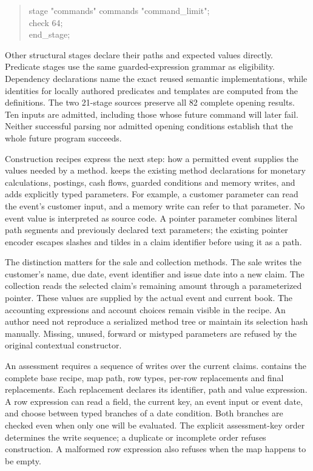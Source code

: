 \begin{quote}\small\ttfamily
stage "commands" commands "command\_limit";\\
check 64;\\
end\_stage;
\end{quote}

Other structural stages declare their paths and expected values directly.
Predicate stages use the same guarded-expression grammar as eligibility.
Dependency declarations name the exact reused semantic implementations, while
identities for locally authored predicates and templates are computed from the
definitions. The two 21-stage sources preserve all 82 complete opening results.
Ten inputs are admitted, including those whose future command will later fail.
Neither successful parsing nor admitted opening conditions establish that the
whole future program succeeds.

Construction recipes express the next step: how a permitted event supplies the
values needed by a method.  keeps the existing
method declarations for monetary calculations, postings, cash flows, guarded
conditions and memory writes, and adds explicitly typed parameters. For
example, a customer parameter can read the event's customer input, and a
memory write can refer to that parameter. No event value is interpreted as
source code. A pointer parameter combines literal path segments and previously
declared text parameters; the existing pointer encoder escapes slashes and
tildes in a claim identifier before using it as a path.

The distinction matters for the sale and collection methods. The sale writes
the customer's name, due date, event identifier and issue date into a new
claim. The collection reads the selected claim's remaining amount through a
parameterized pointer. These values are supplied by the actual event and
current book. The accounting expressions and account choices remain visible
in the recipe. An author need not reproduce a serialized method tree or
maintain its selection hash manually. Missing, unused, forward or mistyped
parameters are refused by the original contextual constructor.

An assessment requires a sequence of writes over the current claims.
 contains the complete base recipe, map path,
row types, per-row replacements and final replacements. Each replacement
declares its identifier, path and value expression. A row expression can read
a field, the current key, an event input or event date, and choose between
typed branches of a date condition. Both branches are checked even when only
one will be evaluated. The explicit assessment-key order determines the write
sequence; a duplicate or incomplete order refuses construction. A malformed
row expression also refuses when the map happens to be empty.

